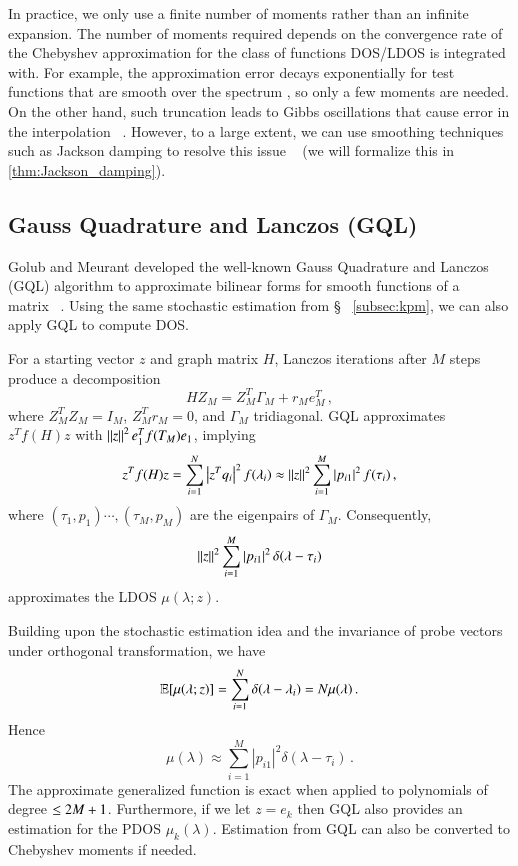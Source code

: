 In practice, we only use a finite number of moments rather than an infinite
expansion. The number of moments required depends on the convergence rate of the
Chebyshev approximation for the class of functions DOS/LDOS is integrated with.
For example, the approximation error decays exponentially for test functions
that are smooth over the spectrum \cite{Trefethen-2013-ATAP}, so only a few
moments are needed. On the other hand, such truncation leads to Gibbs
oscillations that cause error in the interpolation ~\cite{Trefethen-2013-ATAP}.
However, to a large extent, we can use smoothing techniques such as Jackson
damping to resolve this issue ~\cite{jackson1911genauigkeit} (we will formalize
this in \cref{thm:Jackson_damping}).

\subsection{Gauss Quadrature and Lanczos (GQL)}
Golub and Meurant developed the well-known Gauss Quadrature and Lanczos (GQL)
algorithm to approximate bilinear forms for smooth functions of a matrix~
\cite{golub1997matrices}.  Using the same stochastic estimation from \S~
\ref{subsec:kpm}, we can also apply GQL to compute DOS.

For a starting vector $z$ and graph matrix $H$, Lanczos iterations after
$M$ steps produce a decomposition
\begin{equation}
	HZ_M = Z_M^T\Gamma_M + r_Me_M^T\,,
\end{equation}
where $Z_M^TZ_M = I_M$, $Z_M^Tr_M = 0$, and $\Gamma_M$ tridiagonal. GQL 
approximates $z^Tf(H)z$ with $\left\lVert z\right\rVert^2e_1^Tf(T_M)e_1$, implying
\begin{equation}
	z^Tf(H)z = \sum_{i=1}^N \left\lvert z^Tq_i\right\rvert^2f(\lambda_i) \approx \left\lVert z\right\rVert^2\sum_
	{i=1}^M\left\lvert p_{i1}\right\rvert^2f(\tau_i)\,,
\end{equation}
where $(\tau_1,p_1)\cdots,(\tau_M, p_M)$ are the eigenpairs of $\Gamma_M$. 
Consequently,
\begin{equation}
	\left\lVert z\right\rVert^2\sum_{i=1}^M \left\lvert p_{i1}\right\rvert^2\delta(\lambda-\tau_i)
\end{equation}
approximates the LDOS $\mu(\lambda; z)$.

Building upon the stochastic estimation idea and the invariance of probe 
vectors under orthogonal transformation, we have
\begin{equation}
	\operatorname{\mathbb{E}}[\mu(\lambda;z)] = \sum_{i=1}^N \delta(\lambda-\lambda_i) = N\mu
	(\lambda)\,.
\end{equation}
Hence 
\begin{equation}
	\mu(\lambda)\approx\sum_{i=1}^M |p_{i1}|^2\delta(\lambda-\tau_i)\,.
\end{equation}
The approximate generalized function is exact when applied to polynomials of
degree $\mathrel{\leq} 2M+1$. Furthermore, if we let $z = e_k$ then GQL also provides an
estimation for the PDOS $\mu_k(\lambda)$. Estimation from GQL can also be
converted to Chebyshev moments if needed.

